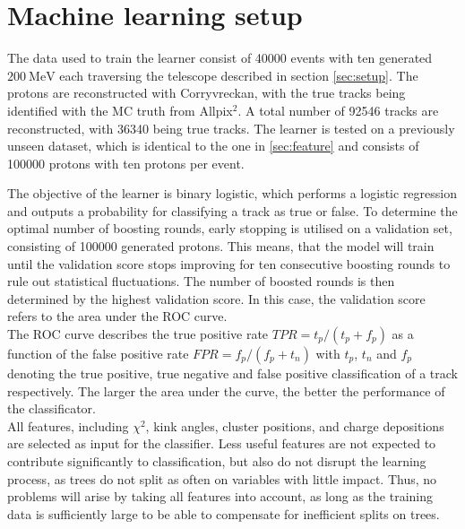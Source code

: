 \section{Machine learning setup}
The data used to train the learner %
consist of 40000 events with ten generated $\SI{200}{\mega\eV}$ each
traversing the telescope described in section \ref{sec:setup}. The protons
are reconstructed with Corryvreckan, with the true tracks being identified with the MC truth from Allpix$^2$. A total number of 92546 tracks
are reconstructed, with 36340 being true tracks.
The learner is tested on a previously unseen dataset, which is identical to the one in \ref{sec:feature} and consists of 100000 protons with ten protons per event.

The objective of the learner is binary logistic, which performs a logistic regression and outputs a probability for classifying a track as true or false.
To determine the optimal number of boosting rounds, early stopping is utilised on a validation set, consisting of 100000 generated protons. This means, that
the model will train until the validation score stops improving for ten consecutive boosting rounds to rule out statistical fluctuations.
The number of boosted rounds is then determined by the highest validation score.
In this case, the validation score refers to the area under the ROC curve. \\
The ROC curve describes the true positive rate $TPR = t_p/(t_p + f_p)$ as a function of the false positive rate $FPR = f_p/(f_p + t_n)$ with
$t_p$, $t_n$ and $f_p$ denoting the true positive, true negative and false positive classification of a track respectively. The larger the area under the curve,
the better the performance of the classificator. \\
All features, including $\chi^2$, kink angles, cluster positions, and charge depositions are selected as input for the classifier. Less useful features
are not expected to contribute significantly to classification, but also do not disrupt the learning process, as trees do not split as often on variables with little impact.
Thus, no problems will arise by taking all features into account, as long as the training data is sufficiently large to be able to compensate for inefficient splits on trees.



